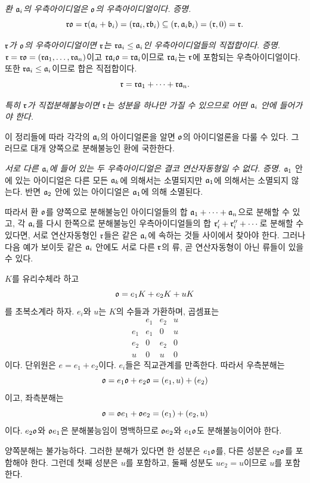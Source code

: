 \emph{환 \(\mathfrak{a}_i\)의 우측아이디얼은 \(\mathfrak o\)의 우측아이디얼이다.}
\emph{증명.}
\[
        \mathfrak r\mathfrak o=\mathfrak r(\mathfrak{a}_i+\mathfrak{b}_i)=(\mathfrak r\mathfrak{a}_i,\mathfrak r\mathfrak{b}_i)
        \subseteq(\mathfrak r,\mathfrak{a}_i\mathfrak{b}_i)=(\mathfrak r,0)=\mathfrak r.
\]

\emph{\(\mathfrak r\)가 \(\mathfrak o\)의 우측아이디얼이면 \(\mathfrak r\)는 \(\mathfrak r\mathfrak{a}_i\leq\mathfrak{a}_i\)인 우측아이디얼들의 직접합이다.}
\emph{증명.} \(\mathfrak r=\mathfrak r\mathfrak o=(\mathfrak r\mathfrak{a}_1,\ldots,\mathfrak r\mathfrak{a}_n)\)이고 \(\mathfrak r\mathfrak{a}_i\mathfrak o=\mathfrak r\mathfrak{a}_i\)이므로 \(\mathfrak r\mathfrak{a}_i\)는 \(\mathfrak r\)에 포함되는 우측아이디얼이다. 또한 \(\mathfrak r\mathfrak{a}_i\leq\mathfrak{a}_i\)이므로 합은 직접합이다.
\[
        \mathfrak r=\mathfrak r\mathfrak{a}_1+\cdots+\mathfrak r\mathfrak{a}_n.
\]

\emph{특히 \(\mathfrak r\)가 직접분해불능이면 \(\mathfrak r\)는 성분을 하나만 가질 수 있으므로 어떤 \(\mathfrak{a}_i\) 안에 들어가야 한다.}

이 정리들에 따라 각각의 \(\mathfrak{a}_i\)의 아이디얼론을 알면 \(\mathfrak o\)의 아이디얼론을 다룰 수 있다. 그러므로 대개 양쪽으로 분해불능인 환에 국한한다.

\emph{서로 다른 \(\mathfrak{a}_i\)에 들어 있는 두 우측아이디얼은 결코 연산자동형일 수 없다.}
\emph{증명.} \(\mathfrak{a}_1\) 안에 있는 아이디얼은 다른 모든 \(\mathfrak{a}_k\)에 의해서는 소멸되지만 \(\mathfrak{a}_1\)에 의해서는 소멸되지 않는다. 반면 \(\mathfrak{a}_2\) 안에 있는 아이디얼은 \(\mathfrak{a}_1\)에 의해 소멸된다.

따라서 환 \(\mathfrak o\)를 양쪽으로 분해불능인 아이디얼들의 합 \(\mathfrak{a}_1+\cdots+\mathfrak{a}_n\)으로 분해할 수 있고, 각 \(\mathfrak{a}_i\)를 다시 한쪽으로 분해불능인 우측아이디얼들의 합 \(\mathfrak r_i'+\mathfrak r_i''+\cdots\)로 분해할 수 있다면, 서로 연산자동형인 \(\mathfrak r\)들은 같은 \(\mathfrak{a}_i\)에 속하는 것들 사이에서 찾아야 한다. 그러나 다음 예가 보이듯 같은 \(\mathfrak{a}_i\) 안에도 서로 다른 \(\mathfrak r\)의 류, 곧 연산자동형이 아닌 류들이 있을 수 있다.

\(K\)를 유리수체라 하고
\[
        \mathfrak o=e_1K+e_2K+uK
\]
를 초복소계라 하자. \(e_i\)와 \(u\)는 \(K\)의 수들과 가환하며, 곱셈표는
\[
\begin{array}{c|ccc}
     & e_1&e_2&u\\ \hline
 e_1 & e_1&0&u\\
 e_2 & 0&e_2&0\\
 u   & 0&u&0
\end{array}
\]
이다. 단위원은 \(e=e_1+e_2\)이다. \(e_i\)들은 직교관계를 만족한다. 따라서 우측분해는
\[
        \mathfrak o=e_1\mathfrak o+e_2\mathfrak o=(e_1,u)+(e_2)
\]
이고, 좌측분해는
\[
        \mathfrak o=\mathfrak o e_1+\mathfrak o e_2=(e_1)+(e_2,u)
\]
이다. \(e_2\mathfrak o\)와 \(\mathfrak o e_1\)은 분해불능임이 명백하므로 \(\mathfrak o e_2\)와 \(e_1\mathfrak o\)도 분해불능이어야 한다.

양쪽분해는 불가능하다. 그러한 분해가 있다면 한 성분은 \(e_1\mathfrak o\)를, 다른 성분은 \(e_2\mathfrak o\)를 포함해야 한다. 그런데 첫째 성분은 \(u\)를 포함하고, 둘째 성분도 \(ue_2=u\)이므로 \(u\)를 포함한다.

